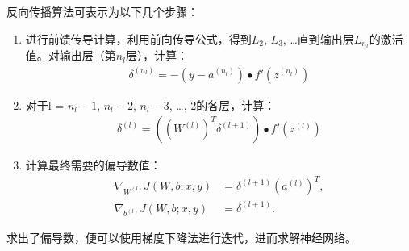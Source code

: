 \documentclass[UTF8]{ctexart}
\begin{document}
\par 反向传播算法可表示为以下几个步骤：\begin{enumerate}
	\item 进行前馈传导计算，利用前向传导公式，得到$L_2$, $L_3$, \ldots 直到输出层$L_{n_l}$的激活值。对输出层（第$n_l$层），计算：
	\begin{align*} \delta^{(n_l)} = - (y - a^{(n_l)}) \bullet f'(z^{(n_l)}) \end{align*} 
	\item 对于l = $n_l-1$, $n_l-2$, $n_l-3$, \ldots, 2的各层，计算：
	\begin{align*} \delta^{(l)} = \left((W^{(l)})^T \delta^{(l+1)}\right) \bullet f'(z^{(l)}) \end{align*} 
	\item 计算最终需要的偏导数值：
	\begin{align*} 
	\nabla_{W^{(l)}} J(W,b;x,y) &= \delta ^{(l+1)} (a^{(l)})^T, \\ \nabla_{b^{(l)}} J(W,b;x,y) &= \delta^{(l+1)}. 
	\end{align*}
\end{enumerate}
\par 求出了偏导数，便可以使用梯度下降法进行迭代，进而求解神经网络。
\end{document}

